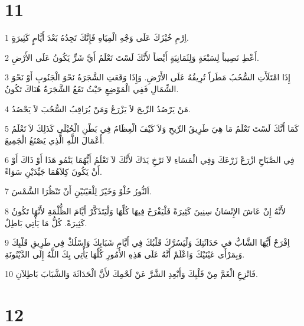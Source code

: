 \chapter{11}

\par 1 اِرْمِ خُبْزَكَ عَلَى وَجْهِ الْمِيَاهِ فَإِنَّكَ تَجِدُهُ بَعْدَ أَيَّامٍ كَثِيرَةٍ.
\par 2 أَعْطِ نَصِيباً لِسَبْعَةٍ وَلِثَمَانِيَةٍ أَيْضاً لأَنَّكَ لَسْتَ تَعْلَمُ أَيَّ شَرٍّ يَكُونُ عَلَى الأَرْضِ.
\par 3 إِذَا امْتَلَأَتِ السُّحُبُ مَطَراً تُرِيقُهُ عَلَى الأَرْضِ. وَإِذَا وَقَعَتِ الشَّجَرَةُ نَحْوَ الْجَنُوبِ أَوْ نَحْوَ الشِّمَالِ فَفِي الْمَوْضِعِ حَيْثُ تَقَعُ الشَّجَرَةُ هُنَاكَ تَكُونُ.
\par 4 مَنْ يَرْصُدُ الرِّيحَ لاَ يَزْرَعُ وَمَنْ يُرَاقِبُ السُّحُبَ لاَ يَحْصُدُ.
\par 5 كَمَا أَنَّكَ لَسْتَ تَعْلَمُ مَا هِيَ طَرِيقُ الرِّيحِ وَلاَ كَيْفَ الْعِظَامُ فِي بَطْنِ الْحُبْلَى كَذَلِكَ لاَ تَعْلَمُ أَعْمَالَ اللَّهِ الَّذِي يَصْنَعُ الْجَمِيعَ.
\par 6 فِي الصَّبَاحِ ازْرَعْ زَرْعَكَ وَفِي الْمَسَاءِ لاَ تَرْخِ يَدَكَ لأَنَّكَ لاَ تَعْلَمُ أَيُّهُمَا يَنْمُو هَذَا أَوْ ذَاكَ أَوْ أَنْ يَكُونَ كِلاَهُمَا جَيِّدَيْنِ سَوَاءً.
\par 7 اَلنُّورُ حُلْوٌ وَخَيْرٌ لِلْعَيْنَيْنِ أَنْ تَنْظُرَا الشَّمْسَ.
\par 8 لأَنَّهُ إِنْ عَاشَ الإِنْسَانُ سِنِينَ كَثِيرَةً فَلْيَفْرَحْ فِيهَا كُلِّهَا وَلْيَتَذَكَّرْ أَيَّامَ الظُّلْمَةِ لأَنَّهَا تَكُونُ كَثِيرَةً. كُلُّ مَا يَأْتِي بَاطِلٌ.
\par 9 اِفْرَحْ أَيُّهَا الشَّابُّ في حَدَاثَتِكَ وَلْيَسُرَّكَ قَلْبُكَ فِي أَيَّامِ شَبَابِكَ وَاسْلُكْ فِي طَرِيقِ قَلْبِكَ وَبِمَرْأَى عَيْنَيْكَ وَاعْلَمْ أَنَّهُ عَلَى هَذِهِ الأُمُورِ كُلِّهَا يَأْتِي بِكَ اللَّهُ إِلَى الدَّيْنُونَةِ.
\par 10 فَانْزِعِ الْغَمَّ مِنْ قَلْبِكَ وَأَبْعِدِ الشَّرَّ عَنْ لَحْمِكَ لأَنَّ الْحَدَاثَةَ وَالشَّبَابَ بَاطِلاَنِ.

\chapter{12}

